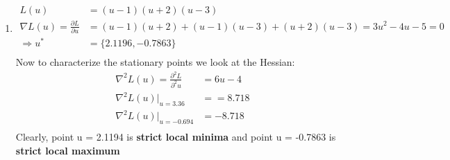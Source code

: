 \begin{enumerate}
\begin{enumerate}
   \item %
   \begin{align*}
    L(u) &= (u-1)(u+2)(u-3) \\
    \nabla L(u) = \frac{\partial L}{\partial u} &= (u-1)(u+2) + (u-1)(u-3) +
(u+2)(u-3) = 3 u^2 -4u -5 = 0\\
    \Rightarrow u^* &= \{2.1196, -0.7863\}\\
  \end{align*}
  Now to characterize the stationary points we look at the Hessian:
  \begin{align*}
   \nabla^2 L(u) = \frac{\partial^2 L}{\partial^2 u} &= 6u -4\\
   \nabla^2 L(u) |_{u = 3.36} &= = 8.718 \\
   \nabla^2 L(u) |_{u = -0.694} &= -8.718 \\
  \end{align*}
  Clearly, point u = 2.1194 is \textbf{strict local minima} and point u = -0.7863
is \textbf{strict local maximum}
  

\end{enumerate}
\end{enumerate}
